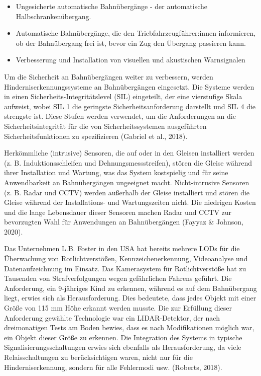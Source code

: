 \documentclass[
]{book}
\providecommand{\tightlist}{%
  \setlength{\itemsep}{0pt}\setlength{\parskip}{0pt}}
\begin{document}
\begin{itemize}
\tightlist
\item
  Ungesicherte automatische Bahnübergänge - der automatische Halbschrankenübergang.
\item
  Automatische Bahnübergänge, die den Triebfahrzeugführer:innen informieren, ob der Bahnübergang frei ist, bevor ein Zug den Übergang passieren kann.
\item
  Verbesserung und Installation von visuellen und akustischen Warnsignalen
\end{itemize}

Um die Sicherheit an Bahnübergängen weiter zu verbessern, werden Hinderniserkennungssysteme an Bahnübergängen eingesetzt. Die Systeme werden in einen Sicherheits-Integritätslevel (SIL) eingeteilt, der eine vierstufige Skala aufweist, wobei SIL 1 die geringste Sicherheitsanforderung darstellt und SIL 4 die strengste ist. Diese Stufen werden verwendet, um die Anforderungen an die Sicherheitsintegrität für die von Sicherheitssystemen ausgeführten Sicherheitsfunktionen zu spezifizieren (Gabriel et al., 2018).

Herkömmliche (intrusive) Sensoren, die auf oder in den Gleisen installiert werden (z. B. Induktionsschleifen und Dehnungsmessstreifen), stören die Gleise während ihrer Installation und Wartung, was das System kostspielig und für seine Anwendbarkeit an Bahnübergängen ungeeignet macht. Nicht-intrusive Sensoren (z. B. Radar und CCTV) werden außerhalb der Gleise installiert und stören die Gleise während der Installations- und Wartungszeiten nicht. Die niedrigen Kosten und die lange Lebensdauer dieser Sensoren machen Radar und CCTV zur bevorzugten Wahl für Anwendungen an Bahnübergängen (Fayyaz \& Johnson, 2020).

Das Unternehmen L.B. Foster in den USA hat bereits mehrere LODs für die Überwachung von Rotlichtverstößen, Kennzeichenerkennung, Videoanalyse und Datenaufzeichnung im Einsatz. Das Kamerasystem für Rotlichtverstöße hat zu Tausenden von Strafverfolgungen wegen gefährlichen Fahrens geführt. Die Anforderung, ein 9-jähriges Kind zu erkennen, während es auf dem Bahnübergang liegt, erwies sich als Herausforderung. Dies bedeutete, dass jedes Objekt mit einer Größe von 115 mm Höhe erkannt werden musste. Die zur Erfüllung dieser Anforderung gewählte Technologie war ein LIDAR-Detektor, der nach dreimonatigen Tests am Boden bewies, dass es nach Modifikationen möglich war, ein Objekt dieser Größe zu erkennen. Die Integration des Systems in typische Signalisierungsschaltungen erwies sich ebenfalls als Herausforderung, da viele Relaisschaltungen zu berücksichtigen waren, nicht nur für die Hinderniserkennung, sondern für alle Fehlermodi usw. (Roberts, 2018).
\end{document}
